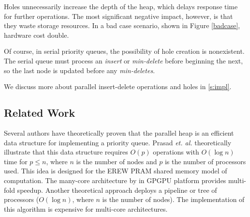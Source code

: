 Holes unnecessarily increase the depth of the heap, which delays response time for further operations.
The most significant negative impact, however, is that they waste storage resources.
In a bad case scenario, shown in Figure \ref{badcase}, hardware cost double.

Of course, in serial priority queues, the possibility of hole creation is nonexistent. 
The serial queue must process an {\it insert} or {\it min-delete} before beginning the next, so the last node is updated before any {\it min-deletes}.

We discuss more about parallel insert-delete operations and holes in \autoref{s:impl}.

\subsection{Related Work}
Several authors have theoretically proven that the parallel heap is an efficient data structure for implementing a priority queue.
Prasad {\it et. al.} \cite{pq3} theoretically illustrate that this data structure requires $O(p)$ operations with $O(\log n)$ time for $p \leq n$, where $n$ is the number of nodes and $p$ is the number of processors used.
This idea is designed for the EREW PRAM shared memory model of computation.
The many-core architecture by \cite{pq2} in GPGPU platform provides multi-fold speedup.
Another theoretical approach \cite{pq4} deploys a pipeline or tree of processors ($O(\log n)$, where $n$ is the number of nodes).
The implementation of this algorithm \cite{pq5} is expensive for multi-core architectures.

